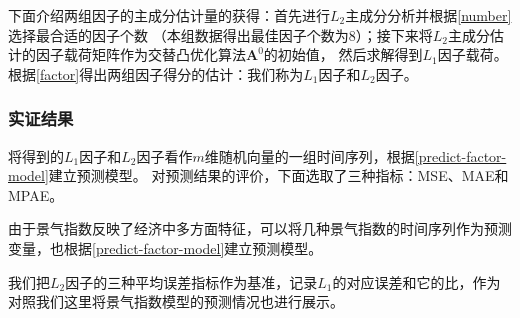 下面介绍两组因子的主成分估计量的获得：首先进行$L_2$主成分分析并根据\eqref{number}选择最合适的因子个数
（本组数据得出最佳因子个数为8）；接下来将$L_2$主成分估计的因子载荷矩阵作为交替凸优化算法$\bm{A}^0$的初始值，
然后求解得到$L_1$因子载荷。根据\eqref{factor}得出两组因子得分的估计：我们称为$L_1$因子和$L_2$因子。

\subsubsection{实证结果}

将得到的$L_1$因子和$L_2$因子看作$m$维随机向量的一组时间序列，根据\eqref{predict-factor-model}建立预测模型。
对预测结果的评价，下面选取了三种指标：MSE、MAE和MPAE。

由于景气指数反映了经济中多方面特征，可以将几种景气指数的时间序列作为预测变量，也根据\eqref{predict-factor-model}建立预测模型。

我们把$L_2$因子的三种平均误差指标作为基准，记录$L_1$的对应误差和它的比，作为对照我们这里将景气指数模型的预测情况也进行展示。

